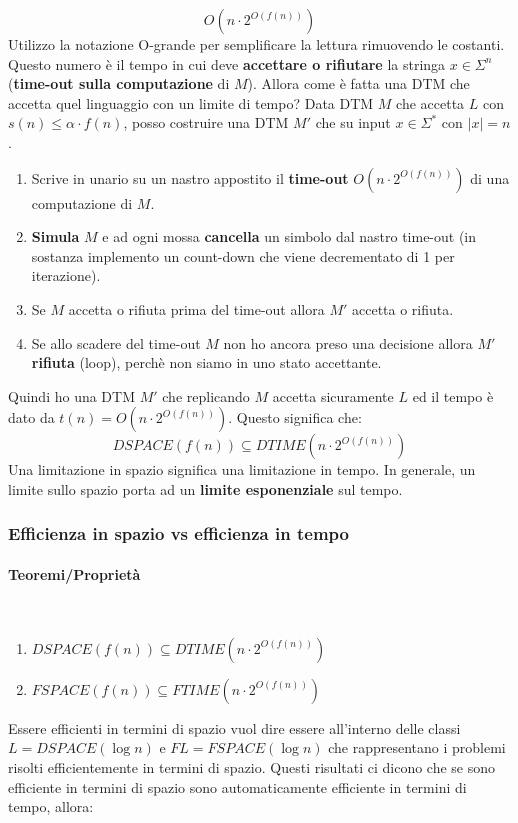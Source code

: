 \documentclass{article}
\begin{document}
$$O(n\cdot 2^{O(f(n))})$$
Utilizzo la notazione O-grande per semplificare la lettura rimuovendo le costanti. Questo numero è
il tempo in cui deve \textbf{accettare o rifiutare} la stringa $x\in\Sigma^n$
(\textbf{time-out sulla computazione} di $M$).
\newline\newline
Allora come è fatta una DTM che accetta quel linguaggio con un limite di tempo? Data DTM $M$ che accetta
$L$ con $s(n)\leq\alpha\cdot f(n)$, posso costruire una DTM $M'$ che su input $x\in\Sigma^*$ con $|x|=n$.
\begin{enumerate}
    \item Scrive in unario su un nastro appostito il \textbf{time-out} $O(n\cdot 2^{O(f(n))})$ di una computazione di $M$.
    \item \textbf{Simula} $M$ e ad ogni mossa \textbf{cancella} un simbolo dal nastro time-out (in
          sostanza implemento un count-down che viene decrementato di 1 per iterazione).
    \item Se $M$ accetta o rifiuta prima del time-out allora $M'$ accetta o rifiuta.
    \item Se allo scadere del time-out $M$ non ho ancora preso una decisione allora $M'$ \textbf{rifiuta} (loop),
          perchè non siamo in uno stato accettante.
\end{enumerate}
Quindi ho una DTM $M'$ che replicando $M$ accetta sicuramente $L$ ed il tempo è
dato da $t(n)=O(n\cdot 2^{O(f(n))})$.
Questo significa che:
$$DSPACE(f(n))\subseteq DTIME(n\cdot 2^{O(f(n))})$$
Una limitazione in spazio significa una limitazione in tempo. In generale, un limite sullo spazio porta
ad un \textbf{limite esponenziale} sul tempo.

\subsubsection{Efficienza in spazio vs efficienza in tempo}
\paragraph{Teoremi/Proprietà}\mbox{}\\
\begin{enumerate}
    \item $DSPACE(f(n))\subseteq DTIME(n\cdot 2^{O(f(n))})$
    \item $FSPACE(f(n))\subseteq FTIME(n\cdot 2^{O(f(n))})$
\end{enumerate}
Essere efficienti in termini di spazio vuol dire essere all'interno delle classi
$L=DSPACE(\log n)$ e $FL=FSPACE(\log n)$ che
rappresentano i problemi risolti efficientemente in termini di spazio.
Questi risultati ci dicono che se sono efficiente in termini di spazio sono automaticamente
efficiente in termini di tempo, allora:
\end{document}
